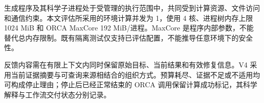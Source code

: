 生成程序及其科学子进程处于受管理的执行范围中，共同受到计算资源、文件访问和通信约束。本文评估所采用的环境计算并发为 1，使用 4 核、进程树内存上限 1024 MiB 和 ORCA MaxCore 192 MiB/进程。MaxCore 是程序内部参数，不能替代总内存限制。既有隔离测试仅支持已评估配置，不能推导任意环境下的安全性。

反馈内容需在有限上下文内同时保留原始目标、当前结果和有效修复信息。V4 采用当前证据摘要与可查询来源相结合的组织方式。预算耗尽、证据不足或不适用均可构成停止理由；停止后已经正常结束的 ORCA 调用保留计算成功标记，其科学解释与工作流交付状态分别记录。
